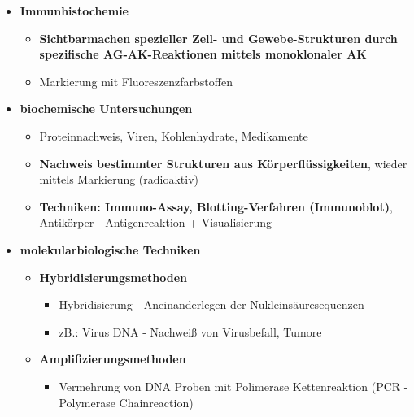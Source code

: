 \begin{itemize}
\begin{itemize}
\begin{itemize}
					\end{itemize}
				\item \textbf{Immunhistochemie}
					\begin{itemize}
						\item \textbf{Sichtbarmachen spezieller Zell- und Gewebe-Strukturen durch spezifische AG-AK-Reaktionen mittels monoklonaler AK}
						\item Markierung mit Fluoreszenzfarbstoffen
					\end{itemize}
				\item \textbf{biochemische Untersuchungen}
					\begin{itemize}
						\item Proteinnachweis, Viren, Kohlenhydrate, Medikamente
						\item \textbf{Nachweis bestimmter Strukturen aus Körperflüssigkeiten}, wieder mittels Markierung (radioaktiv)
						\item \textbf{Techniken: Immuno-Assay, Blotting-Verfahren (Immunoblot)}, Antikörper - Antigenreaktion + Visualisierung
					\end{itemize}
				\item \textbf{molekularbiologische Techniken}
					\begin{itemize}
						\item \textbf{Hybridisierungsmethoden}
							\begin{itemize}
								\item Hybridisierung - Aneinanderlegen der Nukleinsäuresequenzen
								\item zB.: Virus DNA - Nachweiß von Virusbefall, Tumore
							\end{itemize}
						\item \textbf{Amplifizierungsmethoden}
							\begin{itemize}
								\item Vermehrung von DNA Proben mit Polimerase Kettenreaktion (PCR - Polymerase Chainreaction)
							\end{itemize}
					\end{itemize}
		\end{itemize}
	\end{itemize}

\pagebreak
